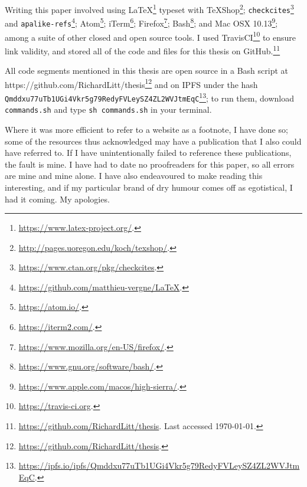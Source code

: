 Writing this paper involved using LaTeX\footnote{\href{https://www.latex-project.org/}{https://www.latex-project.org/}. } typeset with TeXShop\footnote{\href{http://pages.uoregon.edu/koch/texshop/}{http://pages.uoregon.edu/koch/texshop/}. };
{\tt checkcites}\footnote{\href{https://www.ctan.org/pkg/checkcites}{https://www.ctan.org/pkg/checkcites}. } and {\tt apalike-refs}\footnote{\href{https://github.com/matthieu-vergne/LaTeX}{https://github.com/matthieu-vergne/LaTeX}. }; Atom\footnote{\href{https://atom.io/}{https://atom.io/}. }; iTerm\footnote{\href{https://iterm2.com/}{https://iterm2.com/}. }; Firefox\footnote{\href{https://www.mozilla.org/en-US/firefox/}{https://www.mozilla.org/en-US/firefox/}. }; Bash\footnote{\href{https://www.gnu.org/software/bash/}{https://www.gnu.org/software/bash/}. }; and Mac OSX 10.13\footnote{\href{https://www.apple.com/macos/high-sierra/}{https://www.apple.com/macos/high-sierra/}. }; among a suite of other closed and open source tools. I used TravisCI\footnote{\href{https://travis-ci.org}{https://travis-ci.org}. } to ensure link validity, and stored all of the code and files for this thesis on GitHub.\footnote{\href{https://github.com/RichardLitt/thesis}{https://github.com/RichardLitt/thesis}. Last accessed \today.}

All code segments mentioned in this thesis are open source in a Bash script at https://github.com/RichardLitt/thesis\footnote{\href{https://github.com/RichardLitt/thesis}{https://github.com/RichardLitt/thesis}. } and on IPFS under the hash {\tt Qmddxu77uTb1UGi4Vkr5\-g79RedyFVLeySZ4ZL\-2WVJtmEqC}\footnote{\href{https://ipfs.io/ipfs/Qmddxu77uTb1UGi4Vkr5g79RedyFVLeySZ4ZL2WVJtmEqC}{https://ipfs.io/ipfs/Qmddxu77uTb1UGi4Vkr5g79RedyFVLeySZ4ZL2WVJtmEqC}. }; to run them, download {\tt commands.sh} and type {\tt sh commands.sh} in your terminal.

Where it was more efficient to refer to a website as a footnote, I have done so; some of the resources thus acknowledged may have a publication that I also could have referred to. If I have unintentionally failed to reference these publications, the fault is mine. I have had to date no proofreaders for this paper, so all errors are mine and mine alone. I have also endeavoured to make reading this interesting, and if my particular brand of dry humour comes off as egotistical, I had it coming. My apologies.